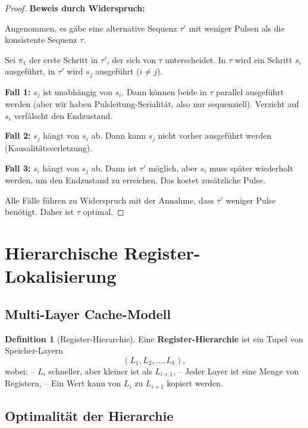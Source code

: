 \documentclass[a4paper,12pt]{article}
\theoremstyle{definition}
\newtheorem{definition}{Definition}
\begin{document}
	\begin{proof}
		\textbf{Beweis durch Widerspruch:}
		
		Angenommen, es gäbe eine alternative Sequenz $\tau'$ mit weniger Pulsen als die konsistente Sequenz $\tau$.
		
		Sei $\pi_1$ der erste Schritt in $\tau'$, der sich von $\tau$ unterscheidet. In $\tau$ wird ein Schritt $s_i$ ausgeführt, in $\tau'$ wird $s_j$ ausgeführt ($i \neq j$).
		
		\textbf{Fall 1:} $s_j$ ist unabhängig von $s_i$. Dann können beide in $\tau$ parallel ausgeführt werden (aber wir haben Pulsleitung-Serialität, also nur sequenziell). Verzicht auf $s_i$ verfälscht den Endzustand.
		
		\textbf{Fall 2:} $s_j$ hängt von $s_i$ ab. Dann kann $s_j$ nicht vorher ausgeführt werden (Kausalitätsverletzung).
		
		\textbf{Fall 3:} $s_i$ hängt von $s_j$ ab. Dann ist $\tau'$ möglich, aber $s_i$ muss später wiederholt werden, um den Endzustand zu erreichen. Das kostet zusätzliche Pulse.
		
		Alle Fälle führen zu Widerspruch mit der Annahme, dass $\tau'$ weniger Pulse benötigt. Daher ist $\tau$ optimal.
	\end{proof}
	
	\section{Hierarchische Register-Lokalisierung}
	\label{sec:hierarchische_register}
	
	\subsection{Multi-Layer Cache-Modell}
	
	\begin{definition}[Register-Hierarchie]
		Eine \textbf{Register-Hierarchie} ist ein Tupel von Speicher-Layern
		\[
		(L_1, L_2, \ldots, L_k),
		\]
		wobei:
		-- $L_i$ schneller, aber kleiner ist als $L_{i+1}$,
		-- Jeder Layer ist eine Menge von Registern,
		-- Ein Wert kann von $L_i$ zu $L_{i+1}$ kopiert werden.
	\end{definition}
	
	\subsection{Optimalität der Hierarchie}
	
\end{document}
